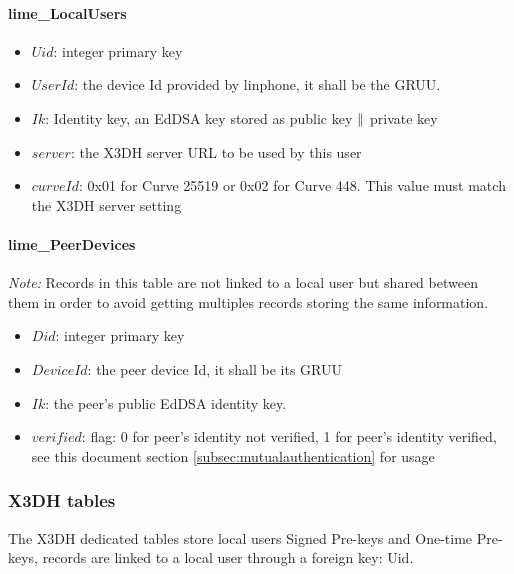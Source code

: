 \documentclass[a4paper,11pt]{article}
\begin{document}
    \paragraph*{lime\_LocalUsers}
    \begin{itemize}
      \item $Uid$: integer primary key
      \item $UserId$: the device Id provided by linphone, it shall be the GRUU.
      \item $Ik$: Identity key, an EdDSA key stored as public key $\Arrowvert $ private key
      \item $server$: the X3DH server URL to be used by this user
      \item $curveId$: 0x01 for Curve 25519 or 0x02 for Curve 448. This value must match the X3DH server setting
    \end{itemize}
    
    \paragraph*{lime\_PeerDevices}
    \textit{Note:} Records in this table are not linked to a local user but shared between them in order to avoid getting multiples records storing the same information.
    \begin{itemize}
      \item $Did$: integer primary key
      \item $DeviceId$: the peer device Id, it shall be its GRUU
      \item $Ik$: the peer's public EdDSA identity key.
      \item $verified$: flag: 0 for peer's identity not verified, 1 for peer's identity verified, see this document section \ref{subsec:mutualauthentication} for usage
    \end{itemize}
    
    \subsubsection{X3DH tables}
    The X3DH dedicated tables store local users Signed Pre-keys and One-time Pre-keys, records are linked to a local user through a foreign key: Uid.
\end{document}
